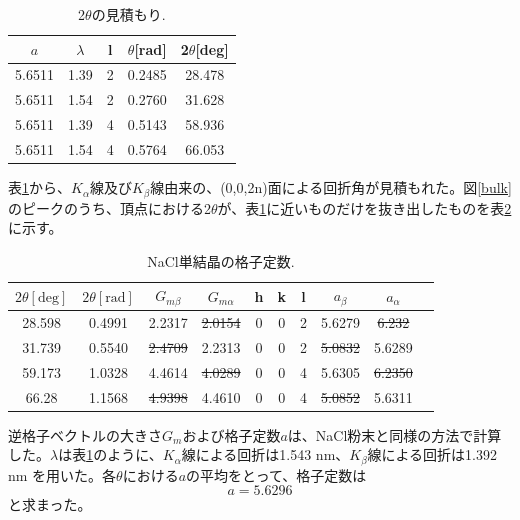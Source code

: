 \documentclass[11pt,a4j,uplatex]{jsarticle}
\begin{document}
\begin{table}[htbp]
 \begin{center}
  \caption{2$\theta$の見積もり.}
  \begin{tabular}{|c|c|c|c|c|}\hline
   $a$        & $\lambda$ & l & $\theta$[rad] & 2$\theta$[deg] \\  \hline  \hline
   5.6511 & 1.39 & 2 & 0.2485 & 28.478\\
 5.6511 & 1.54 & 2 & 0.2760& 31.628\\
 5.6511 & 1.39 & 4 & 0.5143 & 58.936\\
 5.6511 & 1.54 & 4 & 0.5764 & 66.053\\
 \hline
  \end{tabular}
  \label{gyakusan}
 \end{center}
\end{table}

\newpage
表\ref{gyakusan}から、$K_\alpha$線及び$K_\beta$線由来の、(0,0,2n)面による回折角が見積もれた。図\ref{bulk}のピークのうち、頂点における2$\theta$が、表\ref{gyakusan}に近いものだけを抜き出したものを表\ref{crystal}に示す。

\begin{table}[htbp]
 \begin{center}
  \caption{NaCl単結晶の格子定数.}
  \begin{tabular}{|c|c|c|c|ccc|c|c|c|}  \hline
   $2\theta[\mathrm{deg}]$ & $2\theta[\mathrm{rad}]$ & $G_{m\beta}$       & $G_{m\alpha}$      & h & k & l & $a_\beta$          & $a_\alpha$         \\   \hline  \hline
   28.598 & 0.4991 & 2.2317 & \sout{2.0154} & 0 & 0 & 2 & 5.6279 & \sout{6.232}\\
 31.739 & 0.5540 & \sout{2.4709} & 2.2313 & 0 & 0 & 2 & \sout{5.0832} & 5.6289\\
  59.173 & 1.0328 & 4.4614 & \sout{4.0289} & 0 & 0 & 4 & 5.6305 & \sout{6.2350}\\
  66.28 & 1.1568 & \sout{4.9398} & 4.4610 & 0 & 0 & 4 & \sout{5.0852} & 5.6311\\
  \hline
  \end{tabular}
  \label{crystal}
 \end{center}
\end{table}

逆格子ベクトルの大きさ$G_m$および格子定数$a$は、NaCl粉末と同様の方法で計算した。$\lambda$は表\ref{gyakusan}のように、$K_\alpha$線による回折は1.543 nm、$K_\beta$線による回折は1.392 nm を用いた。各$\theta$における$a$の平均をとって、格子定数は
\begin{equation}
 \nonumber
 a=5.6296
 \label{complete2}
\end{equation}
と求まった。
\end{document}
